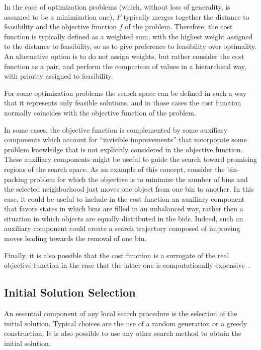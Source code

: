 In the case of optimization problems (which, without loss of
generality, is assumed to be a minimization one), $F$ typically merges
together the distance to feasibility and the objective function $f$ of
the problem.  Therefore, the cost function is typically defined as a
weighted sum, with the highest weight assigned to the distance to
feasibility, so as to give preference to feasibility over
optimality. %
%
An alternative option is to do not assign weights, but rather consider
the cost function as a pair, and perform the comparison of values in a
hierarchical way, with priority assigned to feasibility.

For some optimization problems the search space can be defined in such
a way that it represents only feasible solutions, and in those cases the cost
function normally coincides with the objective function of the problem.

In some cases, the objective function is complemented by some
auxiliary components which account for ``invisible improvements'' that
incorporate some problem knowledge that is not explicitly considered
in the objective function.  These auxiliary components might be useful
to guide the search toward promising regions of the search space.
As an example of this concept, consider the bin-packing problem for
which the objective is to minimize the number of bins and the selected
neighborhood just moves one object from one bin to another. In this
case, it could be useful to include in the cost function an auxiliary
component that favors states in which bins are filled in an unbalanced
way, rather then a situation in which objects are equally distributed
in the bids. Indeed, such an auxiliary component could create a search
trajectory composed of improving moves leading towards the removal of
one bin. %

Finally, it is also possible that the cost function is a surrogate of
the real objective function in the case that the latter one is
computationally expensive~\cite{KoCL11}.

\subsection{Initial Solution Selection}

An essential component of any local search procedure is the selection of
the initial solution. Typical choices are the use of a random
generation or a greedy construction. It is also possible to use any
other search method to obtain the initial solution.

